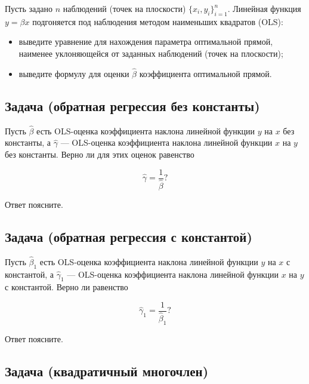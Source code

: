 \documentclass[
  russian,
]{article}
\providecommand{\tightlist}{%
  \setlength{\itemsep}{0pt}\setlength{\parskip}{0pt}}
\begin{document}
Пусть задано \(n\) наблюдений (точек на плоскости)
\(\lbrace x_i,y_i\rbrace_{i=1}^n\). Линейная функция \(y=\beta x\)
подгоняется под наблюдения методом наименьших квадратов (OLS):

\begin{itemize}
\tightlist
\item
  выведите уравнение для нахождения параметра оптимальной прямой,
  наименее уклоняющейся от заданных наблюдений (точек на плоскости);
\item
  выведите формулу для оценки \(\widehat{\beta}\) коэффициента
  оптимальной прямой.
\end{itemize}

\subsection{Задача (обратная регрессия без
константы)}\label{ux437ux430ux434ux430ux447ux430-ux43eux431ux440ux430ux442ux43dux430ux44f-ux440ux435ux433ux440ux435ux441ux441ux438ux44f-ux431ux435ux437-ux43aux43eux43dux441ux442ux430ux43dux442ux44b}

Пусть \(\widehat{\beta}\) есть OLS-оценка коэффициента наклона линейной
функции \(y\) на \(x\) без константы, а \(\widehat{\gamma}\) ---
OLS-оценка коэффициента наклона линейной функции \(x\) на \(y\) без
константы. Верно ли для этих оценок равенство

\[
\widehat{\gamma}=\frac{1}{\widehat{\beta}}?
\]

Ответ поясните.

\subsection{Задача (обратная регрессия с
константой)}\label{ux437ux430ux434ux430ux447ux430-ux43eux431ux440ux430ux442ux43dux430ux44f-ux440ux435ux433ux440ux435ux441ux441ux438ux44f-ux441-ux43aux43eux43dux441ux442ux430ux43dux442ux43eux439}

Пусть \(\widehat{\beta}_1\) есть OLS-оценка коэффициента наклона
линейной функции \(y\) на \(x\) с константой, а \(\widehat{\gamma}_1\)
--- OLS-оценка коэффициента наклона линейной функции \(x\) на \(y\) с
константой. Верно ли равенство

\[
\widehat{\gamma}_1=\frac{1}{\widehat{\beta}_1}?
\]

Ответ поясните.

\subsection{Задача (квадратичный
многочлен)}\label{ux437ux430ux434ux430ux447ux430-ux43aux432ux430ux434ux440ux430ux442ux438ux447ux43dux44bux439-ux43cux43dux43eux433ux43eux447ux43bux435ux43d}
\end{document}
